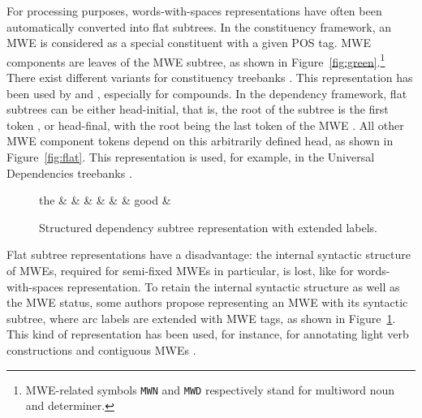 \documentclass[output=paper]{LSP/langsci}
\begin{document}
For processing purposes, words-with-spaces representations have often been automatically converted into flat subtrees. In the constituency framework, an MWE is considered as a special constituent with a given POS tag. MWE components are leaves of the MWE subtree, as shown in Figure~\ref{fig:green}.\footnote{MWE-related symbols \texttt{MWN} and \texttt{MWD} respectively stand for multiword noun and determiner.} There exist different variants for constituency treebanks \citep{gowiska:2010}. This representation has been used by \citet{arun05} and \citet{green11}, especially for compounds. 
In the dependency framework, flat subtrees can be either head-initial, that is, the root of the subtree is the first token \citep{nivre04,seddah13}, or head-final, with the root being the last token of the MWE \citep{eryigit:2011:mes:2206359.2206365}. All other MWE component tokens depend on this arbitrarily defined head, as shown in Figure~\ref{fig:flat}. This representation is used, for example, in the Universal Dependencies treebanks \citep{nivre16}.

\begin{figure}[t]
\small
\begin{center}
\begin{dependency}[edge unit distance=2ex]
\begin{deptext}[column sep=.7cm]
the \& \color{red}{prime} \& \color{red}{minister} \& \color{blue}{made} \& \color{orange}{a} \& \color{orange}{few} \& good \& \color{blue}{decisions} \\
\end{deptext}
\end{dependency}
\vspace{-0.3cm}
\caption{Structured dependency subtree representation with extended labels.}
\label{fig:extended-labels}
\end{center}
\end{figure}



Flat subtree representations have a disadvantage: the internal syntactic structure of MWEs, required for semi-fixed MWEs in particular, is lost, like for words-with-spaces representation. To retain the internal syntactic structure as well as the MWE status, some authors propose representing an MWE with its syntactic subtree, where arc labels are extended with MWE tags, as shown in Figure~\ref{fig:extended-labels}. This kind of representation has been used, for instance, for annotating light verb constructions \citep{Vincze13} and contiguous MWEs \citep{candito2014strategies}. 
\end{document}
